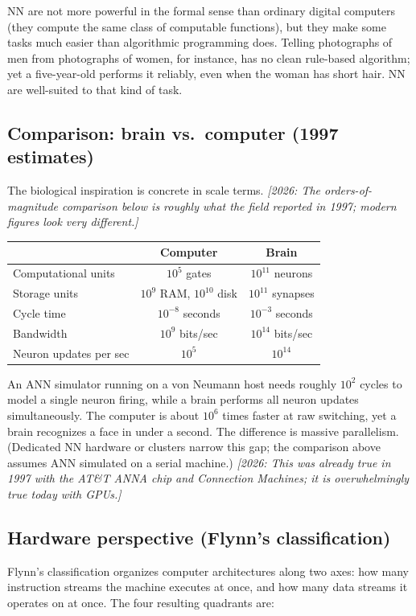 \documentclass[12pt]{article}
\newcommand{\editornote}[1]{\textit{[2026: #1]}}
\begin{document}
NN are not more powerful in the formal sense than ordinary digital computers (they compute the same class of computable functions), but they make some tasks much easier than algorithmic programming does. Telling photographs of men from photographs of women, for instance, has no clean rule-based algorithm; yet a five-year-old performs it reliably, even when the woman has short hair. NN are well-suited to that kind of task.

\subsection{Comparison: brain vs.\ computer (1997 estimates)}
The biological inspiration is concrete in scale terms. \editornote{The orders-of-magnitude comparison below is roughly what the field reported in 1997; modern figures look very different.}

\begin{center}
\begin{tabular}{|l|c|c|}
\hline
                       & \textbf{Computer}        & \textbf{Brain}           \\
\hline
Computational units    & $10^5$ gates             & $10^{11}$ neurons        \\
Storage units          & $10^9$ RAM, $10^{10}$ disk & $10^{11}$ synapses     \\
Cycle time             & $10^{-8}$ seconds        & $10^{-3}$ seconds        \\
Bandwidth              & $10^9$ bits/sec          & $10^{14}$ bits/sec       \\
Neuron updates per sec & $10^5$                   & $10^{14}$                \\
\hline
\end{tabular}
\end{center}

An ANN simulator running on a von Neumann host needs roughly $10^2$ cycles to model a single neuron firing, while a brain performs all neuron updates simultaneously. The computer is about $10^6$ times faster at raw switching, yet a brain recognizes a face in under a second. The difference is massive parallelism. (Dedicated NN hardware or clusters narrow this gap; the comparison above assumes ANN simulated on a serial machine.) \editornote{This was already true in 1997 with the AT\&T ANNA chip and Connection Machines; it is overwhelmingly true today with GPUs.}

\subsection{Hardware perspective (Flynn's classification)}
Flynn's classification organizes computer architectures along two axes: how many instruction streams the machine executes at once, and how many data streams it operates on at once. The four resulting quadrants are:
\end{document}
